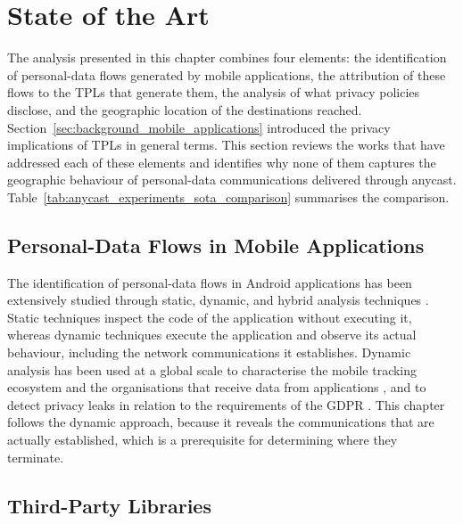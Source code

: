 \section{State of the Art}
\label{sc:anycast_experiments_sota}

The analysis presented in this chapter combines four elements: the identification of personal-data flows generated by mobile applications, the attribution of these flows to the TPLs that generate them, the analysis of what privacy policies disclose, and the geographic location of the destinations reached. Section~\ref{sec:background_mobile_applications} introduced the privacy implications of TPLs in general terms. This section reviews the works that have addressed each of these elements and identifies why none of them captures the geographic behaviour of personal-data communications delivered through anycast. Table~\ref{tab:anycast_experiments_sota_comparison} summarises the comparison.

\subsection{Personal-Data Flows in Mobile Applications}
\label{sc:anycast_experiments_sota_flows}

The identification of personal-data flows in Android applications has been extensively studied through static, dynamic, and hybrid analysis techniques \cite{DelAlamo2021PrivacyStudy}. Static techniques inspect the code of the application without executing it, whereas dynamic techniques execute the application and observe its actual behaviour, including the network communications it establishes. Dynamic analysis has been used at a global scale to characterise the mobile tracking ecosystem and the organisations that receive data from applications \cite{Razaghpanah2018AppsEcosystem}, and to detect privacy leaks in relation to the requirements of the GDPR \cite{Jia2019WhoCompliance}. This chapter follows the dynamic approach, because it reveals the communications that are actually established, which is a prerequisite for determining where they terminate.

\subsection{Third-Party Libraries}
\label{sc:anycast_experiments_sota_tpls}

